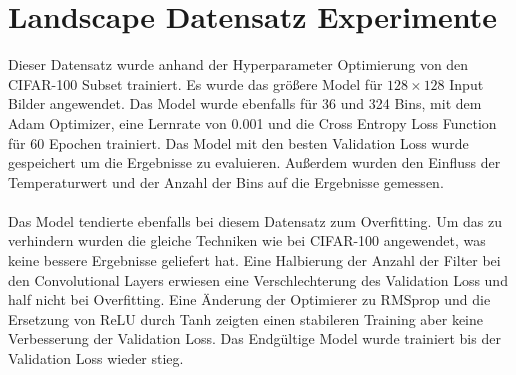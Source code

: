 \section{Landscape Datensatz Experimente}
Dieser Datensatz wurde anhand der Hyperparameter Optimierung von den CIFAR-100 Subset trainiert. Es wurde das größere Model für $128 \times 128$
Input Bilder angewendet. Das Model wurde ebenfalls für 36 und 324 Bins, mit dem Adam Optimizer, eine Lernrate von 0.001 und die Cross Entropy 
Loss Function für 60 Epochen trainiert. Das Model mit den besten Validation Loss wurde gespeichert um die Ergebnisse zu evaluieren. Außerdem
wurden den Einfluss der Temperaturwert und der Anzahl der Bins auf die Ergebnisse gemessen.
\\
\\
Das Model tendierte ebenfalls bei diesem Datensatz zum Overfitting. Um das zu verhindern wurden die gleiche Techniken wie bei CIFAR-100
angewendet, was keine bessere Ergebnisse geliefert hat. Eine Halbierung der Anzahl der Filter bei den Convolutional Layers erwiesen eine Verschlechterung
des Validation Loss und half nicht bei Overfitting. Eine Änderung der Optimierer zu RMSprop und die Ersetzung von ReLU durch Tanh zeigten
einen stabileren Training aber keine Verbesserung der Validation Loss. Das Endgültige Model wurde trainiert bis der Validation Loss wieder stieg.


